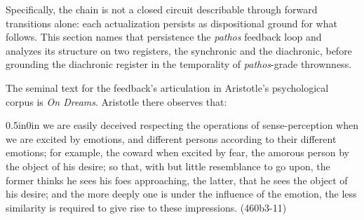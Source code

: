 \documentclass{article}
\begin{document}
Specifically, the chain is not a closed circuit describable through forward transitions alone: each actualization persists as dispositional ground for what follows. This section names that persistence the \textit{pathos} feedback loop and analyzes its structure on two registers, the synchronic and the diachronic, before grounding the diachronic register in the temporality of \textit{pathos}-grade thrownness.

The seminal text for the feedback's articulation in Aristotle's psychological corpus is \textit{On Dreams}. Aristotle there observes that: 
\begin{adjustwidth}{0.5in}{0in}
    we are easily deceived respecting the operations of sense-perception when we are excited by emotions, and different persons according to their different emotions; for example, the coward when excited by fear, the amorous person by the object of his desire; so that, with but little resemblance to go upon, the former thinks he sees his foes approaching, the latter, that he sees the object of his desire; and the more deeply one is under the influence of the emotion, the less similarity is required to give rise to these impressions. (460b3-11)
\end{adjustwidth}
\end{document}
